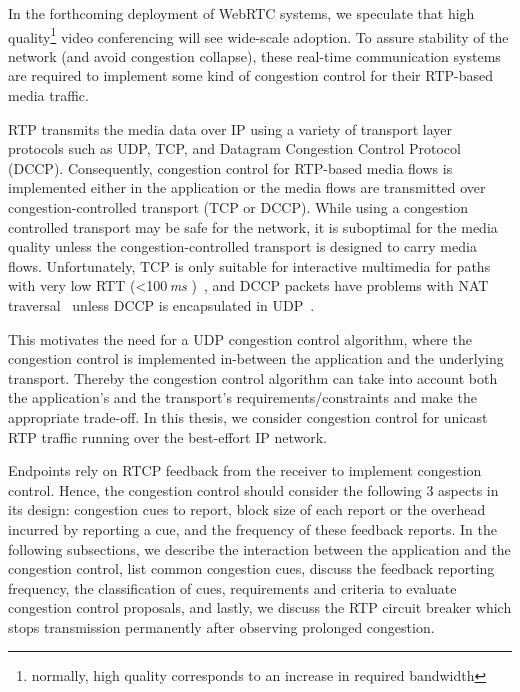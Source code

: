 In the forthcoming deployment of WebRTC systems, we speculate that high
quality\footnote{normally, high quality corresponds to an increase in required
bandwidth} video conferencing will see wide-scale adoption. To assure
stability of the network (and avoid congestion collapse), these real-time
communication systems are required to implement some kind of congestion
control for their RTP-based media traffic.

RTP transmits the media data over IP using a variety of transport layer
protocols such as UDP, TCP, and Datagram Congestion Control Protocol (DCCP).
Consequently, congestion control for RTP-based media flows is implemented
either in the application or the media flows are transmitted over
congestion-controlled transport (TCP or DCCP). While using a congestion
controlled transport may be safe for the network, it is suboptimal for the
media quality unless the congestion-controlled transport is designed to carry
media flows. Unfortunately, TCP is only suitable for interactive multimedia
for paths with very low RTT (<100\,\emph{ms} )~\cite{Brosh:tcp-real-time}, and
DCCP packets have problems with NAT traversal~\cite{schier:DCCP} unless DCCP is
encapsulated in UDP~\cite{RFC6773}.

This motivates the need for a UDP congestion control algorithm, where the
congestion control is implemented in-between the application and the
underlying transport. Thereby the congestion control algorithm can take into
account both the application's and the transport's requirements/constraints
and make the appropriate trade-off. In this thesis, we consider congestion
control for unicast RTP traffic running over the best-effort IP network.


Endpoints rely on RTCP feedback from the receiver to implement congestion
control. Hence, the congestion control should consider the following 3 aspects
in its design: congestion cues to report, block size of each report or the
overhead incurred by reporting a cue, and the frequency of these feedback
reports. In the following subsections, we describe the interaction between the
application and the congestion control, list common congestion cues, discuss
the feedback reporting frequency, the classification of cues, requirements and
criteria to evaluate congestion control proposals, and lastly, we discuss the
RTP circuit breaker which stops transmission permanently after observing
prolonged congestion.


